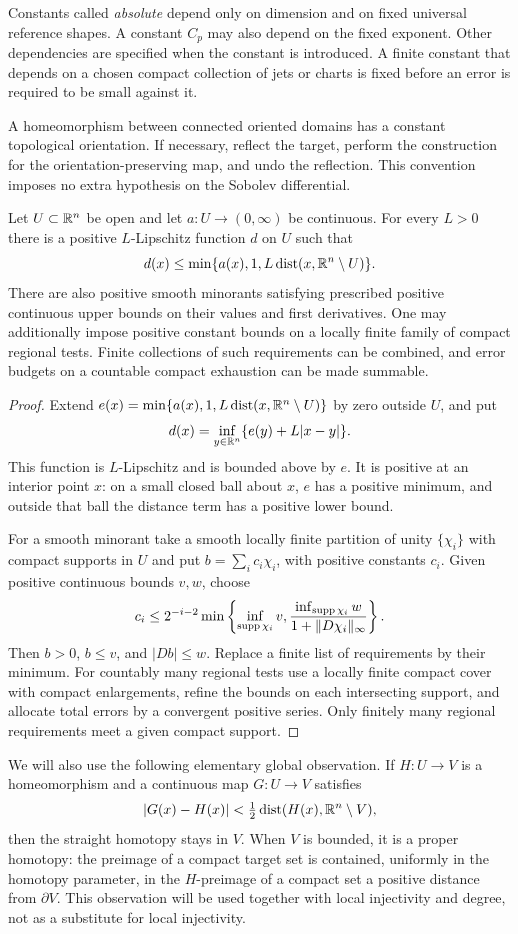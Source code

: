 Constants called \emph{absolute} depend only on dimension and on fixed universal reference shapes. A constant $C_p$ may also depend on the fixed exponent. Other dependencies are specified when the constant is introduced. A finite constant that depends on a chosen compact collection of jets or charts is fixed before an error is required to be small against it.

A homeomorphism between connected oriented domains has a constant topological orientation. If necessary, reflect the target, perform the construction for the orientation-preserving map, and undo the reflection. This convention imposes no extra hypothesis on the Sobolev differential.

\begin{lemma}\label{pre:local-tolerances}
Let $U\subset\mathbb R^n$ be open and let $a:U\to(0,\infty)$ be continuous. For every $L>0$ there is a positive $L$-Lipschitz function $d$ on $U$ such that
\[
 d(x)\le \min\{a(x),1,L\operatorname{dist}(x,\mathbb R^n\setminus U)\}.
\]
There are also positive smooth minorants satisfying prescribed positive continuous upper bounds on their values and first derivatives. One may additionally impose positive constant bounds on a locally finite family of compact regional tests. Finite collections of such requirements can be combined, and error budgets on a countable compact exhaustion can be made summable.
\end{lemma}
\begin{proof}
Extend $e(x)=\min\{a(x),1,L\operatorname{dist}(x,\mathbb R^n\setminus U)\}$ by zero outside $U$, and put
\[
 d(x)=\inf_{y\in\mathbb R^n}\{e(y)+L|x-y|\}.
\]
This function is $L$-Lipschitz and is bounded above by $e$. It is positive at an interior point $x$: on a small closed ball about $x$, $e$ has a positive minimum, and outside that ball the distance term has a positive lower bound.

For a smooth minorant take a smooth locally finite partition of unity $\{\chi_i\}$ with compact supports in $U$ and put $b=\sum_i c_i\chi_i$, with positive constants $c_i$. Given positive continuous bounds $v,w$, choose
\[
 c_i\le 2^{-i-2}\min\left\{
 \inf_{\operatorname{supp}\chi_i}v,
 \frac{\inf_{\operatorname{supp}\chi_i}w}{1+\|D\chi_i\|_\infty}
 \right\}.
\]
Then $b>0$, $b\le v$, and $|Db|\le w$. Replace a finite list of requirements by their minimum. For countably many regional tests use a locally finite compact cover with compact enlargements, refine the bounds on each intersecting support, and allocate total errors by a convergent positive series. Only finitely many regional requirements meet a given compact support.
\end{proof}

We will also use the following elementary global observation. If $H:U\to V$ is a homeomorphism and a continuous map $G:U\to V$ satisfies
\[
 |G(x)-H(x)|<\tfrac12\operatorname{dist}(H(x),\mathbb R^n\setminus V),
\]
then the straight homotopy stays in $V$. When $V$ is bounded, it is a proper homotopy: the preimage of a compact target set is contained, uniformly in the homotopy parameter, in the $H$-preimage of a compact set a positive distance from $\partial V$. This observation will be used together with local injectivity and degree, not as a substitute for local injectivity.
